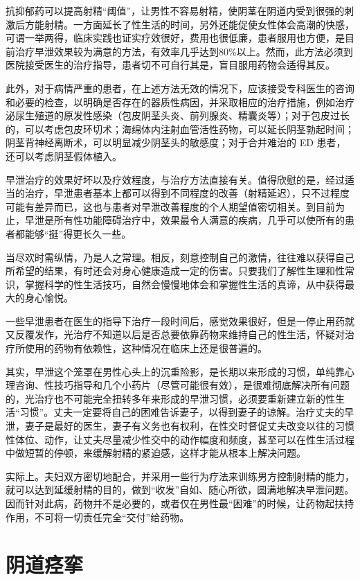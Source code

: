 \documentclass[12pt,UTF8]{ctexbook}
\begin{document}
抗抑郁药可以提高射精“阈值”，让男性不容易射精，使阴茎在阴道内受到很强的刺激后方能射精。一方面延长了性生活的时间，另外还能促使女性体会高潮的快感，可谓一举两得，临床实践也证实疗效很好，费用也很低廉，患者服用也方便，是目前治疗早泄效果较为满意的方法，有效率几乎达到80\%以上。然而，此方法必须到医院接受医生的治疗指导，患者切不可自行其是，盲目服用药物会适得其反。

此外，对于病情严重的患者，在上述方法无效的情况下，应该接受专科医生的咨询和必要的检查，以明确是否存在的器质性病因，并采取相应的治疗措施，例如治疗泌尿生殖道的原发性感染（包皮阴茎头炎、前列腺炎、精囊炎等）；对于包皮过长的，可以考虑包皮环切术；海绵体内注射血管活性药物，可以延长阴茎勃起时间；阴茎背神经离断术，可以明显减少阴茎头的敏感度；对于合并难治的 ED 患者，还可以考虑阴茎假体植入。

早泄治疗的效果好坏以及疗效程度，与治疗方法直接有关。值得欣慰的是，经过适当的治疗，早泄患者基本上都可以得到不同程度的改善（射精延迟），只不过程度可能有差异而已，这也与患者对早泄改善程度的个人期望值密切相关。到目前为止，早泄是所有性功能障碍治疗中，效果最令人满意的疾病，几乎可以使所有的患者都能够“挺”得更长久一些。

当尽欢时需纵情，乃是人之常理。相反，刻意控制自己的激情，往往难以获得自己所希望的结果，有时还会对身心健康造成一定的伤害。只要我们了解性生理和性常识，掌握科学的性生活技巧，自然会慢慢地体会和掌握性生活的真谛，从中获得最大的身心愉悦。

一些早泄患者在医生的指导下治疗一段时间后，感觉效果很好，但是一停止用药就又反覆发作，光治疗不知道以后是否总要依靠药物来维持自己的性生活，怀疑对治疗所使用的药物有依赖性，这种情况在临床上还是很普遍的。

其实，早泄这个笼罩在男性心头上的沉重险影，是长期以来形成的习惯，单纯靠心理咨询、性技巧指导和几个小药片（尽管可能很有效），是很难彻底解决所有问题的，光治疗也不可能完全扭转多年来形成的早泄习惯，必须要重新建立新的性生活“习惯”。丈夫一定要将自己的困难告诉妻子，以得到妻子的谅解。治疗丈夫的早泄，妻子是最好的医生，妻子有义务也有权利，在性交时督促丈夫改变以往的习惯性体位、动作，让丈夫尽量减少性交中的动作幅度和频度，甚至可以在性生活过程中做短暂的停顿，来缓解射精的紧迫感，这样才能从根本上解决问题。

实际上。夫妇双方密切地配合，并采用一些行为疗法来训练男方控制射精的能力，就可以达到延缓射精的目的，做到“收发”自如、随心所欲，圆满地解决早泄问题。因而针对此病，药物并不是必要的，或者仅在男性最“困难”的时候，让药物起扶持作用，不可将一切责任完全“交付”给药物。

\chapter{阴道痉挛}
\end{document}
